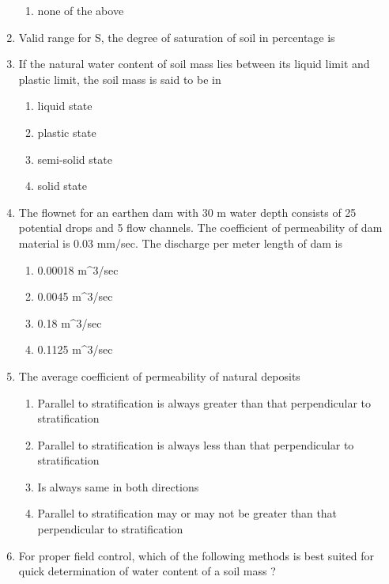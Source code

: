 \documentclass[11pt,a4paper]{article}
\begin{document}
\begin{enumerate}
\begin{enumerate}[label=\Alph*.]
\item{none of the above}
\end{enumerate}
\item{Valid range for S, the degree of saturation of soil in percentage is}
\\
\item{If the natural water content of soil mass lies between its liquid limit and plastic limit, the soil mass is said to be in}
\begin{enumerate}[label=\Alph*.]
\item{liquid state}
\item{plastic state}
\item{semi-solid state}
\item{solid state}
\end{enumerate}
\item{The flownet for an earthen dam with 30 m water depth consists of 25 potential drops and 5 flow channels. The coefficient of permeability of dam material is 0.03 mm/sec. The discharge per meter length of dam is}
\begin{enumerate}[label=\Alph*.]
\item{0.00018 m\^{}3/sec}
\item{0.0045 m\^{}3/sec}
\item{0.18 m\^{}3/sec}
\item{0.1125 m\^{}3/sec}
\end{enumerate}
\item{The average coefficient of permeability of natural deposits}
\begin{enumerate}[label=\Alph*.]
\item{Parallel to stratification is always greater than that perpendicular to stratification}
\item{Parallel to stratification is always less than that perpendicular to stratification}
\item{Is always same in both directions}
\item{Parallel to stratification may or may not be greater than that perpendicular to stratification}
\end{enumerate}
\item{For proper field control, which of the following methods is best suited for quick determination of water content of a soil mass ?}

\end{enumerate}
\end{document}
